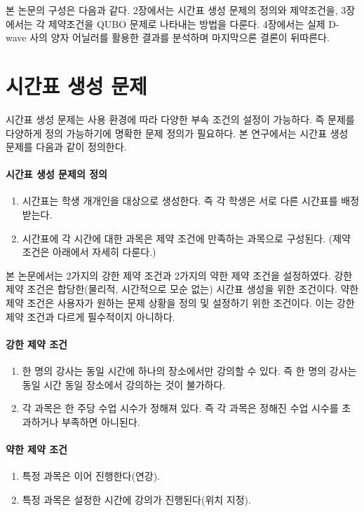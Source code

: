 \documentclass{article}
\begin{document}
본 논문의 구성은 다음과 같다. 2장에서는 시간표 생성 문제의 정의와 제약조건을, 3장에서는 각 제약조건을 QUBO 문제로 나타내는 방법을 다룬다. 4장에서는 실제 D-wave 사의 양자 어닐러를 활용한 결과를 분석하며 마지막으론 결론이 뒤따른다.
    
\section{시간표 생성 문제}\label{sec:problem}

시간표 생성 문제는 사용 환경에 따라 다양한 부속 조건의 설정이 가능하다. 즉 문제를 다양하게 정의 가능하기에 명확한 문제 정의가 필요하다. 본 연구에서는 시간표 생성 문제를 다음과 같이 정의한다.

    \paragraph{시간표 생성 문제의 정의}
    \begin{enumerate}
        \item 시간표는 학생 개개인을 대상으로 생성한다. 즉 각 학생은 서로 다른 시간표를 배정받는다.
        \item 시간표에 각 시간에 대한 과목은 제약 조건에 만족하는 과목으로 구성된다. (제약 조건은 아래에서 자세히 다룬다.)
    \end{enumerate}

본 논문에서는 2가지의 강한 제약 조건과 2가지의 약한 제약 조건을 설정하였다. 강한 제약 조건은 합당한(물리적, 시간적으로 모순 없는) 시간표 생성을 위한 조건이다. 약한 제약 조건은 사용자가 원하는 문제 상황을 정의 및 설정하기 위한 조건이다. 이는 강한 제약 조건과 다르게 필수적이지 아니하다.

    \paragraph{강한 제약 조건}
    \begin{enumerate}
        \item 한 명의 강사는 동일 시간에 하나의 장소에서만 강의할 수 있다. 즉 한 명의 강사는 동일 시간 동일 장소에서 강의하는 것이 불가하다.
        \item 각 과목은 한 주당 수업 시수가 정해져 있다. 즉 각 과목은 정해진 수업 시수를 초과하거나 부족하면 아니된다.
    \end{enumerate}

    \paragraph{약한 제약 조건}
    \begin{enumerate}
        \item 특정 과목은 이어 진행한다(연강).
        \item 특정 과목은 설정한 시간에 강의가 진행된다(위치 지정).
    \end{enumerate}
    
\end{document}
